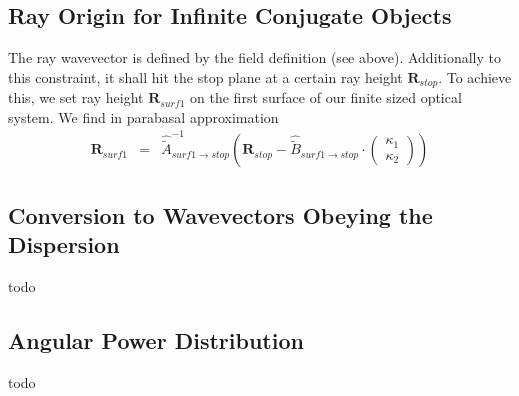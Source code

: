 \documentclass[12pt,a4paper,twoside,openright,BCOR10mm,headsepline,titlepage,abstracton,chapterprefix,final]{scrreprt}
\newcommand\Vector[1]{{\mathbf{#1}}}
\begin{document}
\subsection{Ray Origin for Infinite Conjugate Objects}
The ray wavevector is defined by the field definition (see above).
Additionally to this constraint, it shall hit the stop plane at a certain ray height $\Vector{R}_{stop}$.
To achieve this, we set ray height $\Vector{R}_{surf1}$ on the first surface of our finite sized optical system. 
We find in parabasal approximation
\begin{eqnarray}
 \Vector{R}_{surf1}                 
 &=&
 \hat{\tilde{A}}_{surf1\rightarrow stop}^{-1}
 \left(
   \Vector{R}_{stop} - \hat{\tilde{B}}_{surf1\rightarrow stop} \cdot \begin{pmatrix}\kappa_1 \\ \kappa_2\end{pmatrix}
 \right)
\end{eqnarray}

\subsection{Conversion to Wavevectors Obeying the Dispersion}
todo

\subsection{Angular Power Distribution}
todo
\end{document}
